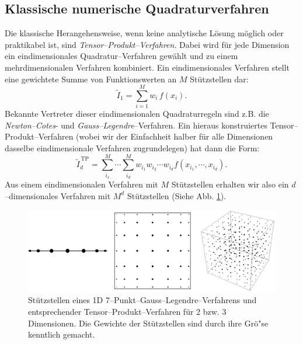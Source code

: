 	\subsection{Klassische numerische Quadraturverfahren}
	Die klassische Herangehensweise, wenn keine analytische Lösung möglich oder praktikabel ist, sind {\em Tensor--Produkt--Verfahren}. Dabei wird für jede Dimension ein eindimensionales Quadratur--Verfahren  gewählt und zu einem mehrdimensionalen Verfahren kombiniert. Ein eindimensionales Verfahren stellt eine gewichtete Summe von Funktionswerten an $M$ Stützstellen dar:
	$${\tilde I}_1=\sum_{i=1}^M w_i\,f(x_i).$$
	Bekannte Vertreter dieser eindimensionalen Quadraturregeln sind z.B. die {\em Newton--Cotes}- und {\em Gauss--Legendre}--Verfahren. Ein hieraus konstruiertes Tensor--Produkt--Verfahren (wobei wir der Einfachheit halber für alle Dimensionen dasselbe eindimensionale Verfahren zugrundelegen) hat dann die Form:
	$${\tilde I}_d^{\,\text{TP}}=\sum_{i_1}^M\cdots\sum_{i_d}^M w_{i_1}w_{i_2}\cdots w_{i_d}f(x_{i_1},\cdots,x_{i_d}).$$
	Aus einem eindimensionalen Verfahren mit $M$ Stützstellen erhalten wir also ein $d$--dimensionales Verfahren mit $M^d$ Stützstellen (Siehe Abb. {\ref{fig:tensorproduct}}).
	\begin{figure}
		\centering
		\includegraphics[height=0.25\textheight]{tensorproduct_quadrature.eps}
		\caption{Stützstellen eines 1D 7--Punkt--Gauss--Legendre--Verfahrens und entsprechender Tensor--Produkt--Verfahren für 2 bzw. 3 Dimensionen. Die Gewichte der Stützstellen sind durch ihre Grö"se kenntlich gemacht.}
		\label{fig:tensorproduct}
	\end{figure}
	
